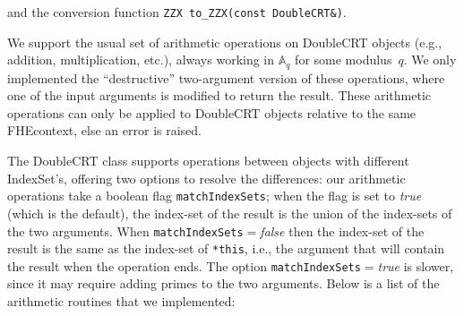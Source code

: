 \documentclass[14pt]{extarticle}
\newcommand{\A}{\mathbb{A}}
\def\IndexSet{\textsf{IndexSet}}
\def\SingleCRT{\textsf{SingleCRT}}
\def\DoubleCRT{\textsf{DoubleCRT}}
\def\FHEcontext{\textsf{FHEcontext}}
\begin{document}
\smallskip\noindent
and the conversion function \texttt{ZZX to\_ZZX(const DoubleCRT\&)}.

We support the usual set of arithmetic operations on {\DoubleCRT}
objects (e.g., addition, multiplication, etc.), always working in
$\A_q$ for some modulus~$q$.  We only implemented the ``destructive''
two-argument version of these operations, where one of the input
arguments is modified to return the result.  These arithmetic
operations can only be applied to {\DoubleCRT} objects relative to the
same {\FHEcontext}, else an error is raised.

The
{\DoubleCRT} class supports operations between objects with different
{\IndexSet}'s, offering two options to resolve the differences: our
arithmetic operations take a boolean flag \texttt{matchIndexSets};
when the flag is set to \emph{true} (which is the default), the
index-set of the result is the union of the index-sets of the two
arguments. When \texttt{matchIndexSets}$=$\emph{false} then the
index-set of the result is the same as the index-set of \texttt{*this},
i.e., the argument that will contain the result when the operation
ends. The option \texttt{matchIndexSets}$=$\emph{true} is slower,
since it may require adding primes to the two arguments. Below is
a list of the arithmetic routines that we implemented:
\end{document}

